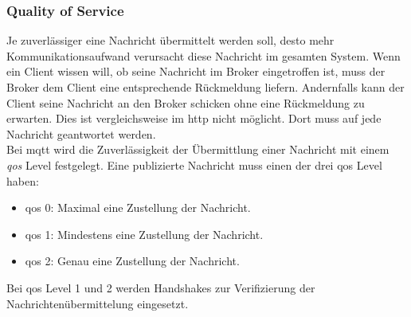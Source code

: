 \subsubsection{Quality of Service} \label{s:qos}
Je zuverlässiger eine Nachricht übermittelt werden soll, desto mehr Kommunikationsaufwand verursacht diese Nachricht im gesamten System.
Wenn ein Client wissen will, ob seine Nachricht im Broker eingetroffen ist, muss der Broker dem Client eine entsprechende Rückmeldung liefern. Andernfalls kann der Client seine Nachricht an den Broker schicken ohne eine Rückmeldung zu erwarten. Dies ist vergleichsweise im \ac{http} nicht möglicht. Dort muss auf jede Nachricht geantwortet werden.\\
Bei \ac{mqtt} wird die Zuverlässigkeit der Übermittlung einer Nachricht mit einem \textit{\acf{qos}} Level festgelegt. Eine publizierte Nachricht muss einen der drei \ac{qos} Level haben:
\begin{itemize}
    \item \ac{qos} 0: Maximal eine Zustellung der Nachricht.
    \item \ac{qos} 1: Mindestens eine Zustellung der Nachricht.
    \item \ac{qos} 2: Genau eine Zustellung der Nachricht.
\end{itemize}
Bei \ac{qos} Level 1 und 2 werden Handshakes zur Verifizierung der Nachrichtenübermittelung eingesetzt.\cite{mqtt5Specification}


